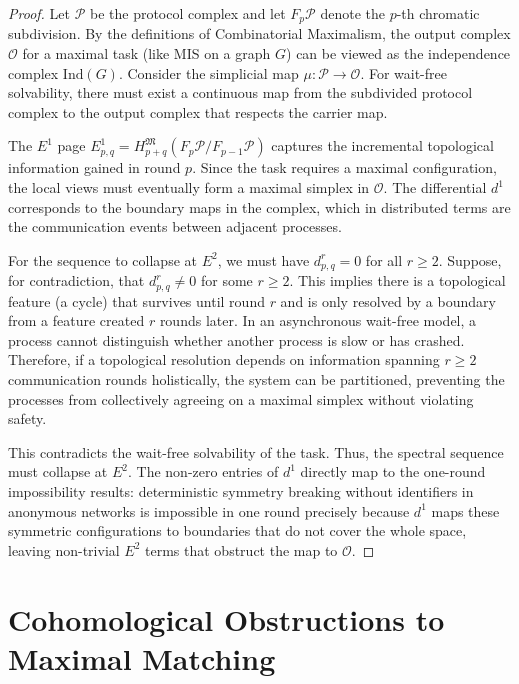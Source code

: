 \begin{proof}
Let $\mathcal{P}$ be the protocol complex and let $F_p \mathcal{P}$ denote the $p$-th chromatic subdivision. 
By the definitions of Combinatorial Maximalism, the output complex $\mathcal{O}$ for a maximal task (like MIS on a graph $G$) can be viewed as the independence complex $\text{Ind}(G)$.
Consider the simplicial map $\mu: \mathcal{P} \to \mathcal{O}$. For wait-free solvability, there must exist a continuous map from the subdivided protocol complex to the output complex that respects the carrier map.

The $E^1$ page $E_{p,q}^1 = H_{p+q}^{\mathfrak{M}}(F_p \mathcal{P} / F_{p-1} \mathcal{P})$ captures the incremental topological information gained in round $p$.
Since the task requires a maximal configuration, the local views must eventually form a maximal simplex in $\mathcal{O}$. The differential $d^1$ corresponds to the boundary maps in the complex, which in distributed terms are the communication events between adjacent processes.

For the sequence to collapse at $E^2$, we must have $d^r_{p,q} = 0$ for all $r \ge 2$.
Suppose, for contradiction, that $d^r_{p,q} \neq 0$ for some $r \ge 2$. This implies there is a topological feature (a cycle) that survives until round $r$ and is only resolved by a boundary from a feature created $r$ rounds later. In an asynchronous wait-free model, a process cannot distinguish whether another process is slow or has crashed. Therefore, if a topological resolution depends on information spanning $r \ge 2$ communication rounds holistically, the system can be partitioned, preventing the processes from collectively agreeing on a maximal simplex without violating safety.

This contradicts the wait-free solvability of the task. Thus, the spectral sequence must collapse at $E^2$.
The non-zero entries of $d^1$ directly map to the one-round impossibility results: deterministic symmetry breaking without identifiers in anonymous networks is impossible in one round precisely because $d^1$ maps these symmetric configurations to boundaries that do not cover the whole space, leaving non-trivial $E^2$ terms that obstruct the map to $\mathcal{O}$.
\end{proof}

\section{Cohomological Obstructions to Maximal Matching}

